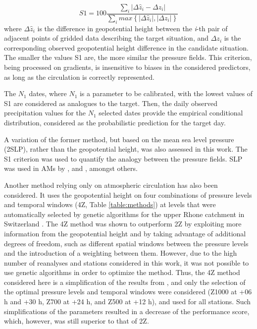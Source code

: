 \documentclass[smallextended]{svjour3}       %
\begin{document}
	\begin{equation}
	\label{eq:S1}
	S1=100 \frac {\displaystyle \sum_{i} \vert \Delta\hat{z}_{i} - \Delta z_{i} \vert}
	{\displaystyle \sum_{i} max\left\lbrace \vert \Delta\hat{z}_{i} \vert , \vert \Delta z_{i} \vert \right\rbrace }
	\end{equation}
	where $\Delta \hat{z}_{i}$ is the difference in geopotential height between the \textit{i}-th pair of adjacent points of gridded data describing the target situation, and $\Delta z_{i}$ is the corresponding observed geopotential height difference in the candidate situation. The smaller the values S1 are, the more similar the pressure fields. This criterion, being processed on gradients, is insensitive to biases in the considered predictors, as long as the circulation is correctly represented.
	
	The $N_{1}$ dates, where $N_{1}$ is a parameter to be calibrated, with the lowest values of S1 are considered as analogues to the target. Then, the daily observed precipitation values for the $N_{1}$ selected dates provide the empirical conditional distribution, considered as the probabilistic prediction for the target day.
	
	A variation of the former method, but based on the mean sea level pressure (2SLP), rather than the geopotential height, was also assessed in this work. The S1 criterion was used to quantify the analogy between the pressure fields. SLP was used in AMs by \citet{Zorita1999}, \citet{Timbal2001a} and \citet{Martin2014b}, amongst others.
	
	Another method relying only on atmospheric circulation has also been considered. It uses the geopotential height on four combinations of pressure levels and temporal windows (4Z, Table \ref{table:methods}) at levels that were automatically selected by genetic algorithms for the upper Rhone catchment in Switzerland \citep{Horton2017b}. The 4Z method was shown to outperform 2Z by exploiting more information from the geopotential height and by taking advantage of additional degrees of freedom, such as different spatial windows between the pressure levels and the introduction of a weighting between them. However, due to the high number of reanalyses and stations considered in this work, it was not possible to use genetic algorithms in order to optimize the method. Thus, the 4Z method considered here is a simplification of the results from \citet{Horton2017b}, and only the selection of the optimal pressure levels and temporal windows were considered (Z1000 at +06 h and +30 h, Z700 at +24 h, and Z500 at +12 h), and used for all stations. Such simplifications of the parameters resulted in a decrease of the performance score, which, however, was still superior to that of 2Z.
	
\end{document}
